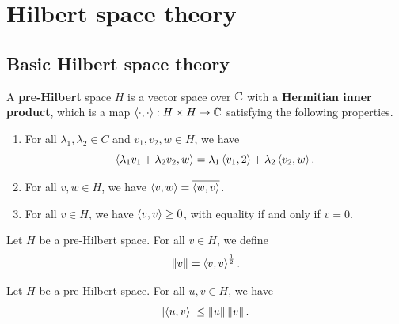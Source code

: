 \documentclass[a4paper]{article}
\begin{document}
\section{Hilbert space theory}

\subsection{Basic Hilbert space theory}

\begin{defi}
  A \textbf{pre-Hilbert} space $H$ is a vector space over 
  $\mathbb{C}$ with a \textbf{Hermitian inner product}, which is a 
  map $\left\langle \cdot, \cdot \right\rangle : H \times H \to \mathbb{C}$ satisfying
  the following properties.

  \begin{enumerate}
    \item For all $\lambda_1, \lambda_2 \in C$ and 
    $v_1, v_2, w \in H$, we have 
    \[
    \left\langle \lambda_1 v_1 + \lambda_2 v_2, w \right\rangle 
    = \lambda_1 \left\langle v_1, 2 \right\rangle + \lambda_2 \left\langle v_2, w \right\rangle.
    \]

    \item For all $v, w \in H$, we have $\left\langle v, w \right\rangle 
    = \overline{\left\langle w, v \right\rangle}$.

    \item For all $v \in H$, we have $\left\langle v, v \right\rangle \geq 0$, 
    with equality if and only if $v = 0$.
  \end{enumerate}
\end{defi}

\begin{defi}
Let $H$ be a pre-Hilbert space. For all $v \in H$, we 
define 
\[
\left\lVert v\right\rVert = \left\langle v, v \right\rangle^{\frac{1}{2}}.
\]
\end{defi}

\begin{thm}
Let $H$ be a pre-Hilbert space. For all $u, v \in H$, we
have 
\[
\left\lvert \left\langle u, v \right\rangle\right\rvert \leq \left\lVert u\right\rVert \left\lVert v\right\rVert.
\]
\end{thm}
\end{document}
